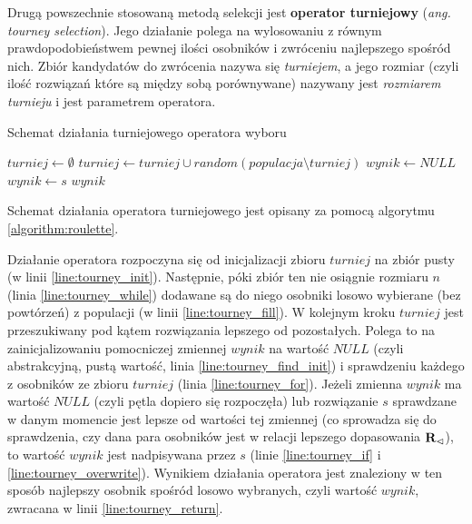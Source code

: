 \documentclass[./FM_mgr.tex]{subfiles}
\begin{document}
	Drugą powszechnie stosowaną metodą selekcji jest \textbf{operator turniejowy} (\emph{ang. tourney selection}).
	Jego działanie polega na wylosowaniu z równym prawdopodobieństwem pewnej ilości osobników i zwróceniu najlepszego spośród nich.
	Zbiór kandydatów do zwrócenia nazywa się \emph{turniejem}, a jego rozmiar (czyli ilość rozwiązań które są między sobą porównywane) nazywany jest \emph{rozmiarem turnieju} i jest parametrem operatora.
	
	\begin{algorithm}[h]
		\caption{Schemat działania turniejowego operatora wyboru \label{algorithm:tourney}}
		\begin{algorithmic}[1]
			\Start
			\Var $turniej \gets \emptyset$
			\label{line:tourney_init}
			\label{line:tourney_while}
			\State $turniej \gets turniej \cup random(populacja \setminus turniej)$
			\label{line:tourney_fill}
			\EndWhile
			\Var $wynik \gets NULL$
			\label{line:tourney_find_init}
			\label{line:tourney_for}
			\label{line:tourney_if}
			\State $wynik \gets s$
			\label{line:tourney_overwrite}
			\EndIf
			\EndFor
			\State \Return $wynik$
			\label{line:tourney_return}
			\EndOperator
		\end{algorithmic}
	\end{algorithm}
	
	Schemat działania operatora turniejowego jest opisany za pomocą algorytmu \ref{algorithm:roulette}.
	
	Działanie operatora rozpoczyna się od inicjalizacji zbioru $turniej$ na zbiór pusty (w linii \ref{line:tourney_init}).
	Następnie, póki zbiór ten nie osiągnie rozmiaru $n$ (linia \ref{line:tourney_while}) dodawane są do niego osobniki losowo wybierane (bez powtórzeń) z populacji (w linii \ref{line:tourney_fill}).
	W kolejnym kroku $turniej$ jest przeszukiwany pod kątem rozwiązania lepszego od pozostałych.
	Polega to na zainicjalizowaniu pomocniczej zmiennej $wynik$ na wartość $NULL$ (czyli abstrakcyjną, pustą wartość, linia \ref{line:tourney_find_init}) i sprawdzeniu każdego z osobników ze zbioru $turniej$ (linia \ref{line:tourney_for}). 
	Jeżeli zmienna $wynik$ ma wartość $NULL$ (czyli pętla dopiero się rozpoczęła) lub rozwiązanie $s$ sprawdzane w danym momencie jest lepsze od wartości tej zmiennej (co sprowadza się do sprawdzenia, czy dana para osobników jest w relacji lepszego dopasowania ${\mathbf{R}}_{\lhd}$), to wartość $wynik$ jest nadpisywana przez $s$ (linie \ref{line:tourney_if} i \ref{line:tourney_overwrite}).
	Wynikiem działania operatora jest znaleziony w ten sposób najlepszy osobnik spośród losowo wybranych, czyli wartość $wynik$, zwracana w linii \ref{line:tourney_return}.
	
\end{document}
